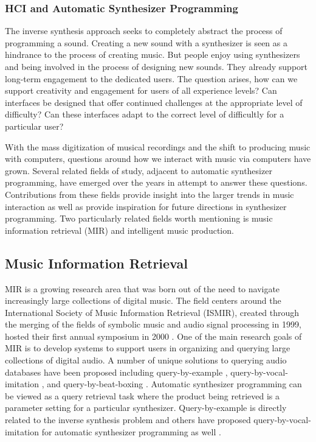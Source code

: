 \subsubsection{HCI and Automatic Synthesizer Programming}
The inverse synthesis approach seeks to completely abstract the process of programming a sound. Creating a new sound with a synthesizer is seen as a hindrance to the process of creating music. But people enjoy using synthesizers and being involved in the process of designing new sounds. They already support long-term engagement to the dedicated users. The question arises, how can we support creativity and engagement for users of all experience levels? Can interfaces be designed that offer continued challenges at the appropriate level of difficulty? Can these interfaces adapt to the correct level of difficultly for a particular user?

With the mass digitization of musical recordings and the shift to producing music with computers, questions around how we interact with music via computers have grown. Several related fields of study, adjacent to automatic synthesizer programming, have emerged over the years in attempt to answer these questions. Contributions from these fields provide insight into the larger trends in music interaction as well as provide inspiration for future directions in synthesizer programming. Two particularly related fields worth mentioning is music information retrieval (MIR) and intelligent music production.

\subsection{Music Information Retrieval}
MIR is a growing research area that was born out of the need to navigate increasingly large collections of digital music. The field centers around the International Society of Music Information Retrieval (ISMIR), created through the merging of the fields of symbolic music and audio signal processing in 1999, hosted their first annual symposium in 2000 \cite{downie2009ten}. One of the main research goals of MIR is to develop systems to support users in organizing and querying large collections of digital audio. A number of unique solutions to querying audio databases have been proposed including query-by-example \cite{zloof1977query}, query-by-vocal-imitation \cite{blancas2014sound}, and query-by-beat-boxing \cite{kapur2004query}. Automatic synthesizer programming can be viewed as a query retrieval task where the product being retrieved is a parameter setting for a particular synthesizer. Query-by-example is directly related to the inverse synthesis problem and others have proposed query-by-vocal-imitation for automatic synthesizer programming as well \cite{cartwright2014synthassist}. 

